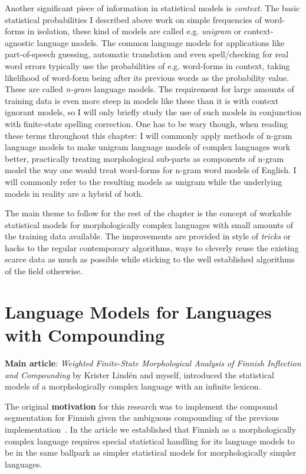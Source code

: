 \documentclass[officiallayout]{unihelcompling}
\begin{document}
Another significant piece of information in statistical models is
\emph{context}. The basic statistical probabilities I described above work on
simple frequencies of word-forms in isolation, these kind of models are called
e.g. \emph{unigram} or context-agnostic language models. The common language
models for applications like part-of-speech guessing, automatic translation and
even spell\-/checking for real word errors typically use the probabilities of
e.g.  word-forms in context, taking likelihood of word-form being after its
previous words as the probability value. These are called \emph{n-gram}
language models.  The requirement for large amounts of training data is even
more steep in models like these than it is with context ignorant models, so I
will only briefly study the use of such models in conjunction with finite-state
spelling correction. One has to be wary though, when reading these terms
throughout this chapter: I will commonly apply methods of n-gram language
models to make unigram language models of complex languages work better,
practically treating morphological sub-parts as components of n-gram model the
way one would treat word-forms for n-gram word models of English. I will
commonly refer to the resulting models as unigram while the underlying models
in reality are a hybrid of both.

The main theme to follow for the rest of the chapter is the concept of workable
statistical models for morphologically complex languages with small amounts of
the training data available. The improvements are provided in style of
\emph{tricks} or hacks to the regular contemporary algorithms, ways to cleverly
reuse the existing scarce data as much as possible while sticking to the well
established algorithms of the field otherwise.

\section{Language Models for Languages with Compounding}
\label{sec:compounding}

\textbf{Main article}: \emph{Weighted Finite-State Morphological Analysis of
Finnish Inflection and Compounding}  by Krister
Lindén and myself, introduced the statistical models of a morphologically
complex language with an infinite lexicon.

The original \textbf{motivation} for this research was to implement the
compound segmentation for Finnish given the ambiguous compounding of the
previous implementation~\citep{pirinen2008suomen}. In the article we
established that Finnish as a morphologically complex language requires special
statistical handling for its language models to be in the same ballpark as
simpler statistical models for morphologically simpler languages.
\end{document}
